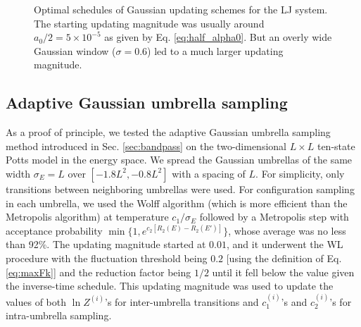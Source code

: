 \documentclass[reprint, superscriptaddress, floatfix]{revtex4-1}
\begin{document}
\begin{figure}[h]
\begin{center}
  \caption{
    \label{fig:lj_alpha}
    Optimal schedules of Gaussian updating schemes
    for the LJ system.
    The starting updating magnitude was usually
    around $a_0/2 = 5\times10^{-5}$
    as given by Eq. \eqref{eq:half_alpha0}.
    But an overly wide Gaussian window ($\sigma = 0.6$)
    led to a much larger updating magnitude.
  }
\end{center}
\end{figure}




\subsection{\label{sec:potts}
Adaptive Gaussian umbrella sampling}


As a proof of principle,
we tested the adaptive Gaussian umbrella sampling method
introduced in Sec. \ref{sec:bandpass}
on the two-dimensional $L\times L$ ten-state
Potts model\cite{wu1982, newman, wang2001, wang2001pre}
in the energy space.
%
We spread the Gaussian umbrellas
of the same width $\sigma_E = L$ over $[-1.8L^2, -0.8L^2]$
with a spacing of $L$.
%
For simplicity,
only transitions between neighboring umbrellas
were used.
%
For configuration sampling in each umbrella,
we used the Wolff algorithm\cite{wolff1989, newman}
(which is more efficient than the Metropolis algorithm)
at temperature $c_1/\sigma_E$
followed by a Metropolis step with
acceptance probability
$\min\bigl\{1, e^{c_2 [R_2(E) - R_2(E')]} \bigr\}$,
whose average was no less than 92\%.
%
The updating magnitude started at $0.01$,
and it underwent the WL procedure
with the fluctuation threshold being $0.2$
[using the definition of Eq. \eqref{eq:maxFk}]
and the reduction factor being $1/2$
until it fell below
the value given the inverse-time schedule\cite{
belardinelli2007, *belardinelli2007jcp, *belardinelli2008, *belardinelli2016}.
%
This updating magnitude was
used to update the values of both $\ln Z^{(i)}$'s
for inter-umbrella transitions
and $c_1^{(i)}$'s and $c_2^{(i)}$'s
for intra-umbrella sampling.

\end{document}
